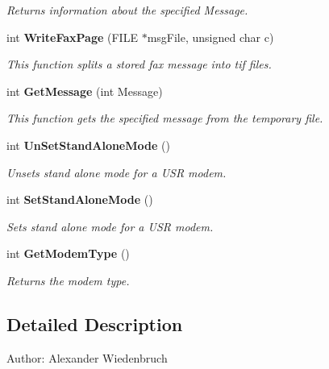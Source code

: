 \begin{CompactItemize}
\begin{CompactList}\small\item\em Returns information about the specified Message. \item\end{CompactList}\item 
int {\bf Write\-Fax\-Page} (FILE $\ast$msg\-File, unsigned char c)
\begin{CompactList}\small\item\em This function splits a stored fax message into tif files. \item\end{CompactList}\item 
int {\bf Get\-Message} (int Message)
\begin{CompactList}\small\item\em This function gets the specified message from the temporary file. \item\end{CompactList}\item 
int {\bf Un\-Set\-Stand\-Alone\-Mode} ()
\begin{CompactList}\small\item\em Unsets stand alone mode for a USR modem. \item\end{CompactList}\item 
int {\bf Set\-Stand\-Alone\-Mode} ()
\begin{CompactList}\small\item\em Sets stand alone mode for a USR modem. \item\end{CompactList}\item 
int {\bf Get\-Modem\-Type} ()\label{classUsrSmpThread_a16}

\begin{CompactList}\small\item\em Returns the modem type. \item\end{CompactList}\end{CompactItemize}


\subsection{Detailed Description}
\begin{Desc}
\item[Author:]Alexander Wiedenbruch \end{Desc}




